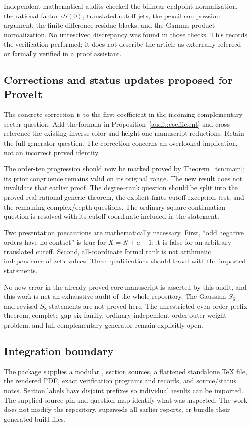 Independent mathematical audits checked the bilinear endpoint
normalization, the rational factor $cS(0)$, translated cutoff jets,
the pencil compression argument, the finite-difference residue
blocks, and the Gamma-product normalization. No unresolved
discrepancy was found in those checks. This records the verification
performed; it does not describe the article as externally refereed
or formally verified in a proof assistant.

\subsection{Corrections and status updates proposed for ProveIt}

The concrete correction is to the first coefficient in the incoming
complementary-sector question. Add the formula in
Proposition~\ref{audit:coefficient} and cross-reference the existing
inverse-color and height-one manuscript reductions. Retain the full
generator question. The correction concerns an overlooked implication,
not an incorrect proved identity.

The order-ten progression should now be marked proved by
Theorem~\ref{ten:main}; its prior congruence remains valid on its
original range. The new result does not invalidate that earlier proof.
The degree--rank question should be split into the proved real-rational
generic theorem, the explicit finite-cutoff exception test, and the
remaining complex/depth questions. The ordinary-square continuation
question is resolved with its cutoff coordinate included in the
statement.

Two presentation precautions are mathematically necessary. First,
``odd negative orders have no contact'' is true for $X=N+a+1$;
it is false for an arbitrary translated cutoff. Second, all-coordinate
formal rank is not arithmetic independence of zeta values. These
qualifications should travel with the imported statements.

No new error in the already proved core manuscript is asserted by
this audit, and this work is not an exhaustive audit of the whole
repository. The Gaussian $S_6$ and revised $S_8$ statements are not
proved here. The unrestricted even-order prefix theorem, complete
gap-six family, ordinary independent-order outer-weight problem,
and full complementary generator remain explicitly open.

\subsection{Integration boundary}

The package supplies a modular , section sources,
a flattened standalone TeX file, the rendered PDF, exact verification
programs and records, and source/status notes. Section labels have
disjoint prefixes so individual results can be imported. The supplied
source pin and question map identify what was inspected. The work
does not modify the repository, supersede all earlier reports, or
bundle their generated build files.
